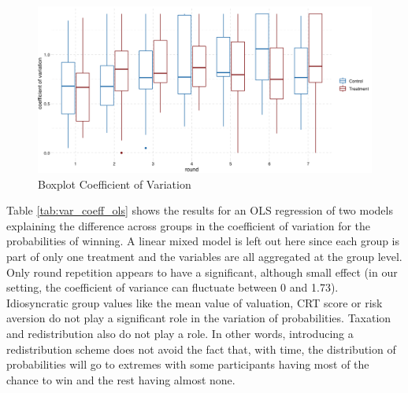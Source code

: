 \begin{figure}[H]
    \centering
    \includegraphics[width = \textwidth]{graphs/var_coeff_prob_boxplot.png}
    \caption{Boxplot Coefficient of Variation}
    \label{fig:var_coeff_boxplot}
\end{figure}

Table \ref{tab:var_coeff_ols} shows the results for an OLS regression of two models explaining the difference across groups in the coefficient of variation for the probabilities of winning. A linear mixed model is left out here since each group is part of only one treatment and the variables are all aggregated at the group level. Only round repetition appears to have a significant, although small effect (in our setting, the coefficient of variance can fluctuate between 0 and 1.73). Idiosyncratic group values like the mean value of valuation, CRT score or risk aversion do not play a significant role in the variation of probabilities. Taxation and redistribution also do not play a role. In other words, introducing a redistribution scheme does not avoid the fact that, with time, the distribution of probabilities will go to extremes with some participants having most of the chance to win and the rest having almost none.\\


